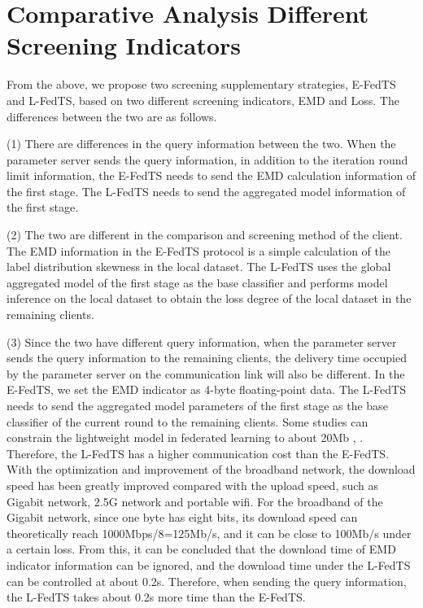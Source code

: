\documentclass{article}
\begin{document}
\section{Comparative Analysis Different Screening Indicators}\label{section1.4}

From the above, we propose two screening supplementary strategies, E-FedTS and L-FedTS, based on two different screening indicators, EMD and Loss. The differences between the two are as follows.

(1) There are differences in the query information between the two. When the parameter server sends the query information, in addition to the iteration round limit information, the E-FedTS needs to send the EMD calculation information of the first stage. The L-FedTS needs to send the aggregated model information of the first stage.

(2) The two are different in the comparison and screening method of the client. The EMD information in the E-FedTS protocol is a simple calculation of the label distribution skewness in the local dataset. The L-FedTS uses the global aggregated model of the first stage as the base classifier and performs model inference on the local dataset to obtain the loss degree of the local dataset in the remaining clients.

(3) Since the two have different query information, when the parameter server sends the query information to the remaining clients, the delivery time occupied by the parameter server on the communication link will also be different. In the E-FedTS, we set the EMD indicator as 4-byte floating-point data. The L-FedTS needs to send the aggregated model parameters of the first stage as the base classifier of the current round to the remaining clients. Some studies can constrain the lightweight model in federated learning to about 20Mb \cite{zhang2011m}, \cite{zhang2015simulation}. Therefore, the L-FedTS has a higher communication cost than the E-FedTS. With the optimization and improvement of the broadband network, the download speed has been greatly improved compared with the upload speed, such as Gigabit network, 2.5G network and portable wifi. For the broadband of the Gigabit network, since one byte has eight bits, its download speed can theoretically reach 1000Mbps/8=125Mb/s, and it can be close to 100Mb/s under a certain loss. From this, it can be concluded that the download time of EMD indicator information can be ignored, and the download time under the L-FedTS can be controlled at about 0.2s. Therefore, when sending the query information, the L-FedTS takes about 0.2s more time than the E-FedTS.
\end{document}
